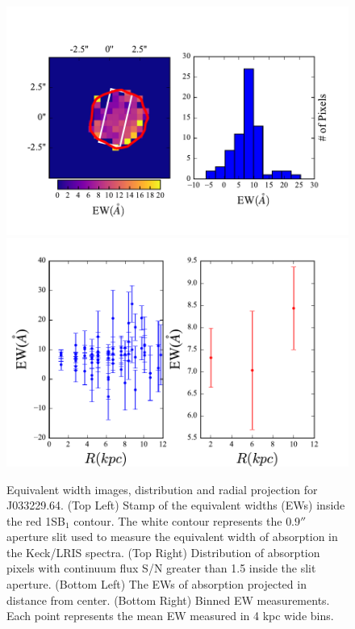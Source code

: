 \documentclass[twocolumn]{aastex61}
\begin{document}
\begin{figure}[]
\centering
\includegraphics[scale=0.9]{../Figures/J64EW.pdf}
\includegraphics[scale=0.9]{../Figures/J64EW_2.pdf}
\caption{ Equivalent width images, distribution and radial projection for J033229.64. (Top Left) Stamp of the equivalent widths (EWs) inside the red 1SB$_1$ contour. The white contour represents the $0.9''$ aperture slit used to measure the equivalent width of absorption in the Keck/LRIS spectra. (Top Right) Distribution of absorption pixels with continuum flux S/N greater than 1.5 inside the slit aperture. (Bottom Left) The EWs of absorption projected in distance from center. (Bottom Right) Binned EW measurements. Each point represents the mean EW measured in 4 kpc wide bins.}
\label{fig:ew44}
\end{figure}
\end{document}
